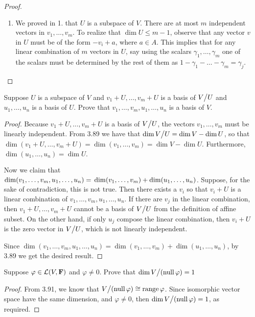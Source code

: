 \begin{proof}
\begin{enumerate}
     \item We proved in 1. that $U$ is a subspace of $V$. There are at most $m$ independent vectors in $v_1,\dots,v_m$. To realize that $\dim U\leq m-1$, observe that any vector $v$ in $U$ must be of the form $-v_i+a$, where $a\in A$. This implies that for any linear combination of $m$ vectors in $U$, say using the scalars $\gamma_1,\dots,\gamma_m$ one of the scalars must be determined by the rest of them as $1-\gamma_1-\dots-\gamma_m=\gamma_j$.
 \end{enumerate}
\end{proof}

\begin{exercise}{13}
  Suppose $U$ is a subspace of $V$ and $v_1+U,\dots,v_m+U$ is a basis of ${\textstyle V}\big/{\textstyle U}$ and $u_1,\dots,u_n$ is a basis of $U$. Prove that $v_1,\dots,v_m,u_1,\dots,u_n$ is a basis of $V$.
\end{exercise}
\begin{proof}
 Because $v_1+U,\dots,v_m+U$ is a basis of ${\textstyle V}\big/{\textstyle U}$, the vectors $v_1,\dots,v_m$ must be linearly independent. From 3.89 we have that $\dim{\textstyle V}\big/{\textstyle U}=\dim V-\dim U$, so that $\dim(v_1+U,\dots,v_m+U)=\dim(v_1,\dots,v_m)=\dim V-\dim U$. Furthermore, $\dim(u_1,\dots,u_n)=\dim U$.
 
 Now we claim that $\dim(v_1,\dots,v_m,u_1,\dots,u_n)=\\\dim(v_1,\dots,v_m)+\dim(u_1,\dots,u_n)$. Suppose, for the sake of contradiction, this is not true. Then there exists a $v_i$ so that $v_i+U$ is a linear combination of $v_1,\dots,v_m,u_1,\dots,u_n$. If there are $v_j$ in the linear combination, then $v_1+U,\dots,v_m+U$ cannot be a basis of ${\textstyle V}\big/{\textstyle U}$ from the definition of affine subset. On the other hand, if only $u_j$ compose the linear combination, then $v_i+U$ is the zero vector in ${\textstyle V}\big/{\textstyle U}$, which is not linearly independent.

 Since $\dim(v_1,\dots,v_m,u_1,\dots,u_n)=\dim(v_1,\dots,v_m)+\dim(u_1,\dots,u_n)$, by 3.89 we get the desired result.
\end{proof}

\begin{exercise}{15}
  Suppose $\varphi\in\mathcal{L}(V,\mathbf{F})$ and $\varphi\neq 0$. Prove that $\dim{\textstyle V}\big/{\textstyle (\operatorname*{null}\varphi)}=1$
\end{exercise}
\begin{proof}
 From 3.91, we know that ${\textstyle V}\big/{\textstyle (\operatorname*{null}\varphi)}\cong\operatorname*{range}\varphi$. Since isomorphic vector space have the same dimension, and $\varphi\neq 0$, then $\dim{\textstyle V}\big/{\textstyle (\operatorname*{null}\varphi)}=1$, as required.
\end{proof}